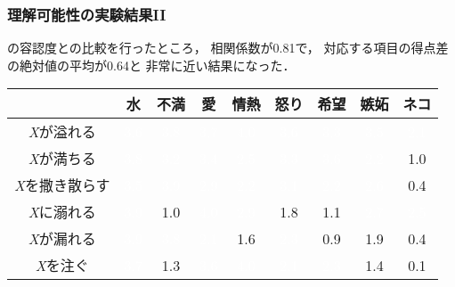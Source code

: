 \documentclass[12pt,usepdftitle=false]{beamer}
\begin{document}
\begin{frame}
    \frametitle{理解可能性の実験結果II}
    \citet{nabeshima2011}の容認度との比較を行ったところ，
    相関係数が0.81で，
    対応する項目の得点差の絶対値の平均が0.64と
    非常に近い結果になった．

    \begin{table}[h]\centering
        \footnotesize
        \begin{tabular}{|c|c|c|c|c|c|c|c|c|}
        \hline
        & 水 & 不満 & 愛 & 情熱 & 怒り & 希望 & 嫉妬 & ネコ \\
        \hline
            \emph{X}が溢れる & \cellcolor{sDarkRed}\textcolor{white}{3.6} & \cellcolor{sDarkRed}\textcolor{white}{3.8} & \cellcolor{sDarkRed}\textcolor{white}{3.7} & \cellcolor{sDarkRed}\textcolor{white}{4.0} & \cellcolor{sDarkRed}\textcolor{white}{3.6} & \cellcolor{sDarkRed}\textcolor{white}{3.3} & \cellcolor{sDarkRed}\textcolor{white}{3.5} & \cellcolor{sOrange}\textcolor{white}{2.1} \\
        \hline
            \emph{X}が満ちる & \cellcolor{sDarkRed}\textcolor{white}{3.8} & \cellcolor{sDarkRed}\textcolor{white}{3.2} & \cellcolor{sDarkRed}\textcolor{white}{3.4} & \cellcolor{sOrange}\textcolor{white}{2.5} & \cellcolor{sDarkRed}\textcolor{white}{3.3} & \cellcolor{sDarkRed}\textcolor{white}{3.6} & \cellcolor{sOrange}\textcolor{white}{2.2} & \cellcolor{sBlonde}1.0 \\
        \hline
            \emph{X}を撒き散らす & \cellcolor{sDarkRed}\textcolor{white}{3.5} & \cellcolor{sDarkRed}\textcolor{white}{3.9} & \cellcolor{sOrange}\textcolor{white}{2.9} & \cellcolor{sOrange}\textcolor{white}{2.2} & \cellcolor{sDarkRed}\textcolor{white}{3.1} & \cellcolor{sOrange}\textcolor{white}{2.2} & \cellcolor{sOrange}\textcolor{white}{2.6} & 0.4 \\
        \hline
            \emph{X}に溺れる & \cellcolor{sDarkRed}\textcolor{white}{3.9} & \cellcolor{sBlonde}1.0 & \cellcolor{sDarkRed}\textcolor{white}{4.0} & \cellcolor{sOrange}\textcolor{white}{2.9} & \cellcolor{sBlonde}1.8 & \cellcolor{sBlonde}1.1 & \cellcolor{sOrange}\textcolor{white}{2.7} & \cellcolor{sOrange}\textcolor{white}{2.5} \\
        \hline
            \emph{X}が漏れる & \cellcolor{sDarkRed}\textcolor{white}{3.9} & \cellcolor{sDarkRed}\textcolor{white}{3.8} & \cellcolor{sOrange}\textcolor{white}{2.1} & \cellcolor{sBlonde}1.6 & \cellcolor{sOrange}\textcolor{white}{2.3} & 0.9 & \cellcolor{sBlonde}1.9 & 0.4 \\
        \hline
            \emph{X}を注ぐ & \cellcolor{sDarkRed}\textcolor{white}{3.7} & \cellcolor{sBlonde}1.3 & \cellcolor{sDarkRed}\textcolor{white}{3.6} & \cellcolor{sDarkRed}\textcolor{white}{4.0} & \cellcolor{sOrange}\textcolor{white}{2.1} & \cellcolor{sOrange}\textcolor{white}{2.3} & \cellcolor{sBlonde}1.4 & 0.1 \\

\end{tabular}
\end{table}
\end{frame}
\end{document}
